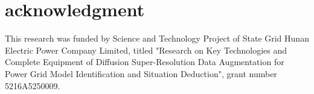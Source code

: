 \section{acknowledgment}
\label{sec:ack}
This research was funded by Science and Technology Project of State Grid Hunan Electric Power Company Limited, titled "Research on Key Technologies and Complete Equipment of Diffusion Super-Resolution Data Augmentation for Power Grid Model Identification and Situation Deduction", grant number 5216A5250009.

